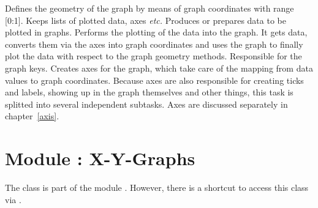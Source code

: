\begin{definitions}
  Defines the geometry of the graph by means of graph coordinates with
  range [0:1]. Keeps lists of plotted data, axes \emph{etc.}
  Produces or prepares data to be plotted in graphs.
  Performs the plotting of the data into the graph. It gets data,
  converts them via the axes into graph coordinates and uses the graph
  to finally plot the data with respect to the graph geometry methods.
  Responsible for the graph keys.
  Creates axes for the graph, which take care of the mapping from data
  values to graph coordinates. Because axes are also responsible for
  creating ticks and labels, showing up in the graph themselves and
  other things, this task is splitted into several independent
  subtasks. Axes are discussed separately in chapter~\ref{axis}.
\end{definitions} %

\section{Module : X-Y-Graphs} %
\label{graph:graph}


The class  is part of the module .
However, there is a shortcut to access this class via
.

